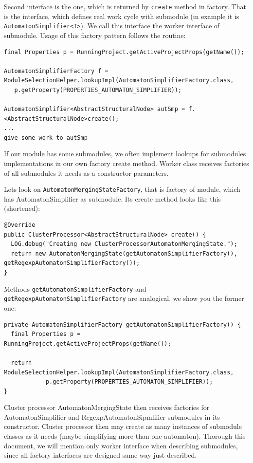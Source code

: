 \documentclass[a4paper,10pt,oneside]{article}
\newcommand{\code}[1]{\texttt{#1}}
\begin{document}
Second interface is the one, which is returned by \code{create} method in factory.
That is the interface, which defines real work cycle with submodule (in example it is \code{AutomatonSimplifier<T>}).
We call this interface the worker interface of submodule.
Usage of this factory pattern follows the routine:
\begin{verbatim}
final Properties p = RunningProject.getActiveProjectProps(getName());

AutomatonSimplifierFactory f = ModuleSelectionHelper.lookupImpl(AutomatonSimplifierFactory.class,
   p.getProperty(PROPERTIES_AUTOMATON_SIMPLIFIER));

AutomatonSimplifier<AbstractStructuralNode> autSmp = f.<AbstractStructuralNode>create();
...
give some work to autSmp
\end{verbatim}
If our module has some submodules, we often implement lookups for submodules implementations in our own factory create method.
Worker class receives factories of all submodules it needs as a constructor parameters.

Lets look on \code{AutomatonMergingStateFactory}, that is factory of module, which has AutomatonSimplifier as submodule.
Its create method looks like this (shortened): 
\begin{verbatim}
@Override
public ClusterProcessor<AbstractStructuralNode> create() {
  LOG.debug("Creating new ClusterProcessorAutomatonMergingState.");
  return new AutomatonMergingState(getAutomatonSimplifierFactory(), getRegexpAutomatonSimplifierFactory());
}
\end{verbatim}
Methods \code{getAutomatonSimplifierFactory} and \code{getRegexpAutomatonSimplifierFactory} are analogical, we show you the former one:
\begin{verbatim}
private AutomatonSimplifierFactory getAutomatonSimplifierFactory() {
  final Properties p = RunningProject.getActiveProjectProps(getName());

  return ModuleSelectionHelper.lookupImpl(AutomatonSimplifierFactory.class,
            p.getProperty(PROPERTIES_AUTOMATON_SIMPLIFIER));
}
\end{verbatim}
Cluster processor AutomatonMergingState then receives factories for AutomatonSimplifier and RegexpAutomatonSipmlifier submodules in its constructor.
Cluster processor then may create as many instances of submodule classes as it needs (maybe simplifying more than one automaton).
Thorough this document, we will mention only worker interface when describing submodules, since all factory interfaces are designed same way just described.
\end{document}
